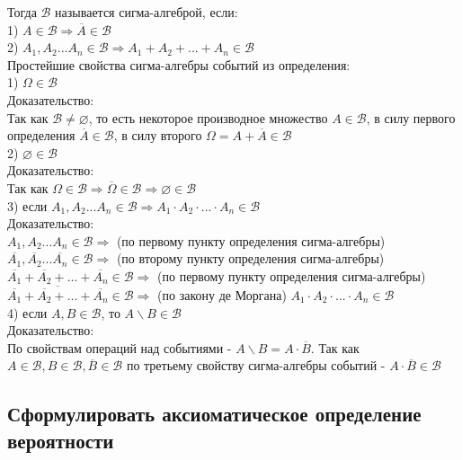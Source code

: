 Тогда $\mathcal{B}$ называется сигма-алгеброй, если:\\
1) $A \in \mathcal{B} \Rightarrow \overline{A} \in \mathcal{B}$\\
2) $A_{1}, A_{2} ... A_{n} \in \mathcal{B} \Rightarrow A_{1} + A_{2} + ... + A_{n} \in \mathcal{B}$\\ 

Простейшие свойства сигма-алгебры событий из определения:\\
1) $\Omega \in \mathcal{B}$\\
Доказательство:\\
Так как $\mathcal{B} \neq \varnothing$, то есть некоторое производное множество $A \in \mathcal{B}$, в силу первого определения $\overline{A} \in \mathcal{B}$, в силу второго $\Omega = A + \overline{A} \in \mathcal{B}$\\
2) $\varnothing \in \mathcal{B}$\\
Доказательство:\\
Так как $\Omega \in \mathcal{B} \Rightarrow \overline{\Omega} \in \mathcal{B} \Rightarrow \varnothing \in \mathcal{B}$\\
3) если $A_{1}, A_{2} ... A_{n} \in \mathcal{B} \Rightarrow A_{1} \cdot A_{2} \cdot ... \cdot A_{n} \in \mathcal{B}$\\
Доказательство:\\
$A_{1}, A_{2} ... A_{n} \in \mathcal{B} \Rightarrow $ (по первому пункту определения сигма-алгебры) $ \overline{A_{1}}, \overline{A_{2}} ... \overline{A_{n}} \in \mathcal{B} \Rightarrow $ (по второму пункту определения сигма-алгебры) $ \overline{A_{1}} + \overline{A_{2}} + ... + \overline{A_{n}} \in \mathcal{B} \Rightarrow $ (по первому пункту определения сигма-алгебры) $ \overline{\overline{A_{1}} + \overline{A_{2}} + ... + \overline{A_{n}}} \in \mathcal{B} \Rightarrow $ (по закону де Моргана) $ A_{1} \cdot A_{2} \cdot ... \cdot A_{n} \in \mathcal{B} $\\
4) если $A, B \in \mathcal{B}$, то $A \backslash B \in \mathcal{B}$\\
Доказательство:\\
По свойствам операций над событиями - $ A \backslash B = A \cdot \overline{B}$. Так как $ A \in \mathcal{B}, B \in \mathcal{B}, \overline{B} \in \mathcal{B}$ по третьему свойству сигма-алгебры событий - $ A \cdot \overline{B} \in \mathcal{B}$

\subsection{Сформулировать аксиоматическое определение вероятности}

